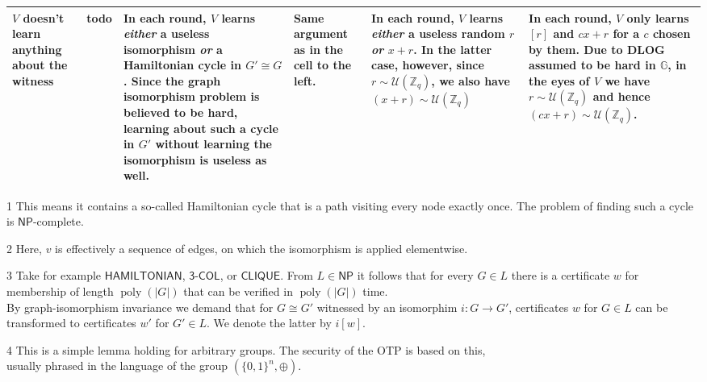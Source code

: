 \documentclass[border=1cm,varwidth=38cm]{standalone}
\DeclareMathOperator\poly{poly}
\newcommand{\complexityProblem}[1]{\textsf{#1}}
\newcommand\NP{\complexityProblem{NP}}
\newcommand\graph{G}
\newcommand\graphP{G'}
\newcommand\graphCert{w}
\newcommand\graphCertP{w'}
\newcommand{\centeredCell}[1]{\centering#1\arraybackslash}
\begin{document}
\begin{threeparttable}
\begin{tabularx}{36.5cm}{m{4cm}|m{6cm}|m{6cm}|m{6cm}|m{6cm}|m{6cm}}
	\centeredCell{$V$ doesn't learn anything about the witness}
	& todo
	& In each round, $V$ learns \emph{either} a useless isomorphism \emph{or} a Hamiltonian cycle in $\graphP \cong \graph$. Since the graph isomorphism problem is believed to be hard, learning about such a cycle in $\graphP$ without learning the isomorphism is useless as well.
	& Same argument as in the cell to the left.
	& In each round, $V$ learns \emph{either} a useless random $r$ \emph{or} $x + r$. In the latter case, however, since $r \sim \mathcal{U}(\mathbb{Z}_q)$, we also have $(x + r) \sim \mathcal{U}(\mathbb{Z}_q)$\tnote{4}
	& In each round, $V$ only learns $[r]$ and $cx + r$ for a $c$ chosen by them. Due to DLOG assumed to be hard in $\mathbb{G}$, in the eyes of $V$ we have $r \sim \mathcal{U}(\mathbb{Z}_q)$ and hence $(cx + r) \sim \mathcal{U}(\mathbb{Z}_q)$\tnote{4}.\\\hline\hline
\end{tabularx}
\begin{tablenotes}
	\item[1] This means it contains a so-called Hamiltonian cycle that is a path visiting every node exactly once. The problem of finding such a cycle is $\NP$-complete.
	\item[2] Here, $v$ is effectively a sequence of edges, on which the isomorphism is applied elementwise.
	\item[3] Take for example $\complexityProblem{HAMILTONIAN}$, $\complexityProblem{3-COL}$, or $\complexityProblem{CLIQUE}$. From $L \in \NP$ it follows that for every $\graph \in L$ there is a certificate $w$ for membership of length $\poly(|\graph|)$ that can be verified in $\poly(|\graph|)$ time.\\By graph-isomorphism invariance we demand that for $\graph \cong \graphP$ witnessed by an isomorphim $i \colon \graph \to \graphP$, certificates $\graphCert$ for $\graph \in L$ can be transformed to certificates $\graphCertP$ for $\graphP \in L$. We denote the latter by $i[\graphCert]$.
	\item[4] This is a simple lemma holding for arbitrary groups. The security of the OTP is based on this,\\usually phrased in the language of the group $(\{0,1\}^n, \oplus)$.
\end{tablenotes}
\end{threeparttable}
\end{document}
